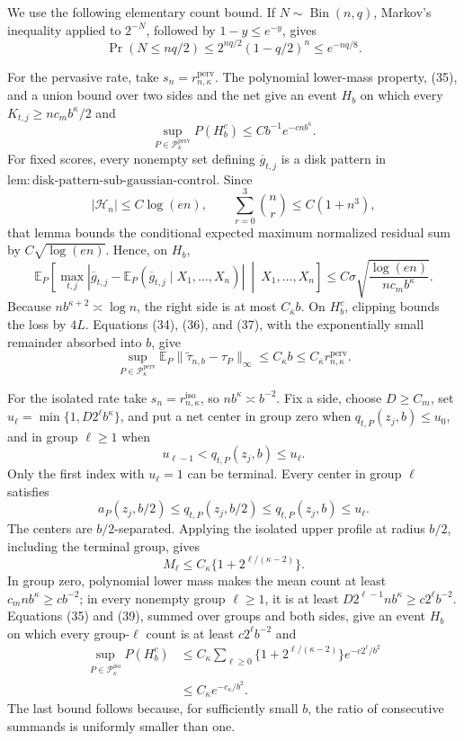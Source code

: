We use the following elementary count bound.  If
\(N\sim\operatorname{Bin}(n,q)\), Markov's inequality applied to
\(2^{-N}\), followed by \(1-y\le e^{-y}\), gives
\[
 \Pr(N\le nq/2)
 \le2^{nq/2}(1-q/2)^n
 \le e^{-nq/8}. \tag{35}
\]

For the pervasive rate, take \(s_n=r_{n,\kappa}^{\mathrm{perv}}\).  The
polynomial lower-mass property, (35), and a union bound over two sides and
the net give an event \(H_b\) on which every
\(K_{t,j}\ge nc_mb^{\kappa}/2\) and
\[
 \sup_{P\in\mathcal P_{\kappa}^{\mathrm{perv}}}P(H_b^c)
 \le Cb^{-1}e^{-cnb^{\kappa}}. \tag{36}
\]
For fixed scores, every nonempty set defining \(\overline g_{t,j}\) is a
disk pattern in
\(\mathrm{lem:disk\text{-}pattern\text{-}sub\text{-}gaussian\text{-}control}\).
Since
\[
 |\mathcal H_n|\le C\log(en),
 \qquad \sum_{r=0}^3\binom nr\le C(1+n^3),
\]
that lemma bounds the conditional expected maximum normalized residual
sum by \(C\sqrt{\log(en)}\).  Hence, on \(H_b\),
\[
 \mathbb E_P\left[
 \max_{t,j}\left|
 \overline g_{t,j}-\mathbb E_P(\overline g_{t,j}\mid X_1,\ldots,X_n)
 \right|\ \middle|\ X_1,\ldots,X_n\right]
 \le C\sigma\sqrt{\frac{\log(en)}{nc_mb^{\kappa}}}. \tag{37}
\]
Because \(nb^{\kappa+2}\asymp\log n\), the right side is at most
\(C_{\overline\kappa}b\).  On \(H_b^c\), clipping bounds the loss by
\(4L\).  Equations (34), (36), and (37), with the exponentially small
remainder absorbed into \(b\), give
\[
 \sup_{P\in\mathcal P_{\kappa}^{\mathrm{perv}}}
 \mathbb E_P\lVert\widetilde\tau_{n,b}-\tau_P\rVert_{\infty}
 \le C_{\overline\kappa}b
 \le C_{\overline\kappa}r_{n,\kappa}^{\mathrm{perv}}. \tag{38}
\]

For the isolated rate take \(s_n=r_{n,\kappa}^{\mathrm{iso}}\), so
\(nb^{\kappa}\asymp b^{-2}\).  Fix a side, choose \(D\ge C_m\), set
\(u_\ell=\min\{1,D2^\ell b^{\kappa}\}\), and put a net center in group
zero when \(q_{t,P}(z_j,b)\le u_0\), and in group \(\ell\ge1\) when
\[
 u_{\ell-1}<q_{t,P}(z_j,b)\le u_\ell.
\]
Only the first index with \(u_\ell=1\) can be terminal.  Every center in
group \(\ell\) satisfies
\[
 a_P(z_j,b/2)\le q_{t,P}(z_j,b/2)
 \le q_{t,P}(z_j,b)\le u_\ell.
\]
The centers are \(b/2\)-separated.  Applying the isolated upper profile
at radius \(b/2\), including the terminal group, gives
\[
 M_\ell\le C_{\kappa}
 \{1+2^{\ell/(\kappa-2)}\}. \tag{39}
\]
In group zero, polynomial lower mass makes the mean count at least
\(c_mnb^{\kappa}\ge cb^{-2}\); in every nonempty group \(\ell\ge1\), it
is at least \(D2^{\ell-1}nb^{\kappa}\ge c2^\ell b^{-2}\).  Equations
(35) and (39), summed over groups and both sides, give an event \(H_b\)
on which every group-\(\ell\) count is at least \(c2^\ell b^{-2}\) and
\[
 \begin{aligned}
 \sup_{P\in\mathcal P_{\kappa}^{\mathrm{iso}}}P(H_b^c)
 &\le C_{\kappa}\sum_{\ell\ge0}
 \{1+2^{\ell/(\kappa-2)}\}e^{-c2^\ell/b^2}\\
 &\le C_{\kappa}e^{-c_{\kappa}/b^2}.
 \end{aligned} \tag{40}
\]
The last bound follows because, for sufficiently small \(b\), the ratio
of consecutive summands is uniformly smaller than one.

